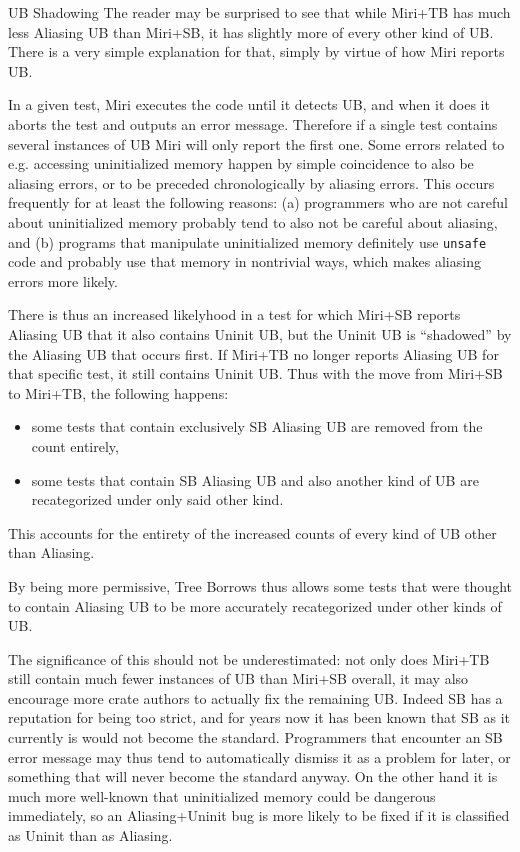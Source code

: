 \documentclass[a4paper,11pt]{article}
\theoremstyle{plain}
\theoremstyle{definition}
\theoremstyle{remark}
\begin{document}
\begin{paragraph}{UB Shadowing}
    The reader may be surprised to see that while Miri+TB has much less Aliasing UB than Miri+SB,
    it has slightly more of every other kind of UB. There is a very simple explanation for that,
    simply by virtue of how Miri reports UB.

    In a given test, Miri executes the code until it detects UB, and when it does it aborts the test
    and outputs an error message. Therefore if a single test contains several instances of UB
    Miri will only report the first one. Some errors related to e.g. accessing uninitialized memory
    happen by simple coincidence to also be aliasing errors, or to be preceded chronologically by
    aliasing errors. This occurs frequently for at least the following reasons: (a) programmers
    who are not careful about uninitialized memory probably tend to also not be careful about aliasing,
    and (b) programs that manipulate uninitialized memory definitely use \texttt{unsafe} code and probably
    use that memory in nontrivial ways, which makes aliasing errors more likely.

    There is thus an increased likelyhood in a test for which Miri+SB reports Aliasing UB
    that it also contains Uninit UB, but the Uninit UB is ``shadowed'' by the Aliasing UB that occurs
    first. If Miri+TB no longer reports Aliasing UB for that specific test, it still contains Uninit UB.
    Thus with the move from Miri+SB to Miri+TB, the following happens:
    \begin{itemize}
        \item some tests that contain exclusively SB Aliasing UB are removed from the count entirely,
        \item some tests that contain SB Aliasing UB and also another kind of UB are recategorized under
            only said other kind.
    \end{itemize}
    This accounts for the entirety of the increased counts of every kind of UB other than Aliasing.

    By being more permissive, Tree Borrows thus allows some tests that were
    thought to contain Aliasing UB to be more accurately recategorized under other kinds of UB.

    The significance of this should not be underestimated: not only does Miri+TB still contain much fewer
    instances of UB than Miri+SB overall, it may also encourage more crate authors to actually fix the remaining UB.
    Indeed SB has a reputation for being too strict, and for years now it has been known that SB as it currently
    is would not become the standard. Programmers that encounter an SB error message may thus tend to automatically
    dismiss it as a problem for later, or something that will never become the standard anyway.
    On the other hand it is much more well-known that uninitialized memory could be dangerous immediately,
    so an Aliasing+Uninit bug is more likely to be fixed if it is classified as Uninit than as Aliasing.
\end{paragraph}
\end{document}
